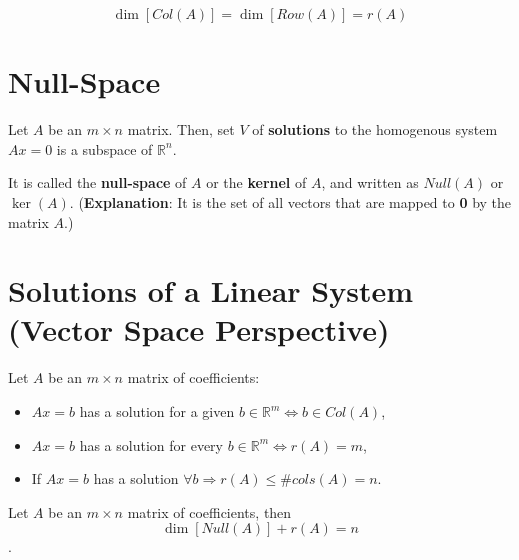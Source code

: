 \begin{theorem}
    \begin{equation*}
        \dim[Col(A)] = \dim[Row(A)] = r(A)
    \end{equation*}
\end{theorem}


\section{Null-Space} %

\begin{theorem}
    Let $A$ be an $m \times n$ matrix. Then, set $V$ of \textbf{solutions} to the homogenous system $Ax=0$ is a subspace of $\mathbb{R}^{n}$.
\end{theorem}

\begin{remark*}
    It is called the \textbf{null-space} of $A$ or the \textbf{kernel} of $A$, and written as $Null(A)$ or $\ker(A)$. (\textbf{Explanation}: It is the set of all vectors that are mapped to \textbf{0} by the matrix $A$.)
\end{remark*}

\section{Solutions of a Linear System (Vector Space Perspective)}

\begin{theorem}
    Let $A$ be an $m \times n$ matrix of coefficients:
    \begin{itemize}
        \item $Ax=b$ has a solution for a given $b \in \mathbb{R}^{m} \iff b \in Col(A)$,
        \item  $Ax=b$ has a solution for every $b \in \mathbb{R}^{m} \iff r(A) = m$,
        \item If $Ax=b$ has a solution $\forall b \Rightarrow r(A) \leq \# cols(A)=n$.
    \end{itemize}
\end{theorem}


\begin{theorem} Let $A$ be an $m \times n$ matrix of coefficients, then
    \begin{equation*}
        \dim[Null(A)] + r(A) = n
    \end{equation*}.
\end{theorem}